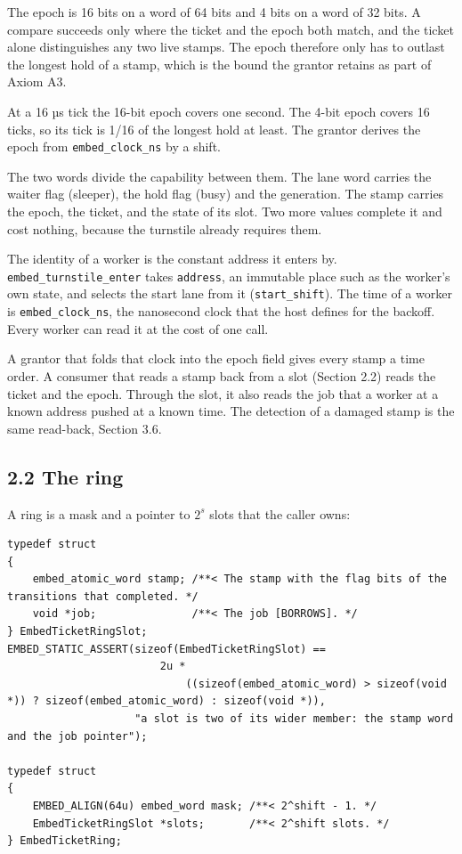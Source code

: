 The epoch is 16 bits on a word of 64 bits and 4 bits on a word of 32 bits. A compare succeeds only where the ticket and the epoch both match, and the ticket alone distinguishes any two live stamps. The epoch therefore only has to outlast the longest hold of a stamp, which is the bound the grantor retains as part of Axiom A3.

At a 16 µs tick the 16-bit epoch covers one second. The 4-bit epoch covers 16 ticks, so its tick is 1/16 of the longest hold at least. The grantor derives the epoch from \texttt{embed\_\allowbreak{}clock\_\allowbreak{}ns} by a shift.

The two words divide the capability between them. The lane word carries the waiter flag (sleeper), the hold flag (busy) and the generation. The stamp carries the epoch, the ticket, and the state of its slot. Two more values complete it and cost nothing, because the turnstile already requires them.

The identity of a worker is the constant address it enters by. \texttt{embed\_\allowbreak{}turnstile\_\allowbreak{}enter} takes \texttt{address}, an immutable place such as the worker's own state, and selects the start lane from it (\texttt{start\_\allowbreak{}shift}). The time of a worker is \texttt{embed\_\allowbreak{}clock\_\allowbreak{}ns}, the nanosecond clock that the host defines for the backoff. Every worker can read it at the cost of one call.

A grantor that folds that clock into the epoch field gives every stamp a time order. A consumer that reads a stamp back from a slot (Section 2.2) reads the ticket and the epoch. Through the slot, it also reads the job that a worker at a known address pushed at a known time. The detection of a damaged stamp is the same read-back, Section 3.6.

\subsection{\texorpdfstring{2.2 The ring}{2.2 The ring}}

A ring is a mask and a pointer to \(2^{s}\) slots that the caller owns:

\begin{Verbatim}
typedef struct
{
    embed_atomic_word stamp; /**< The stamp with the flag bits of the transitions that completed. */
    void *job;               /**< The job [BORROWS]. */
} EmbedTicketRingSlot;
EMBED_STATIC_ASSERT(sizeof(EmbedTicketRingSlot) ==
                        2u *
                            ((sizeof(embed_atomic_word) > sizeof(void *)) ? sizeof(embed_atomic_word) : sizeof(void *)),
                    "a slot is two of its wider member: the stamp word and the job pointer");

typedef struct
{
    EMBED_ALIGN(64u) embed_word mask; /**< 2^shift - 1. */
    EmbedTicketRingSlot *slots;       /**< 2^shift slots. */
} EmbedTicketRing;
\end{Verbatim}


